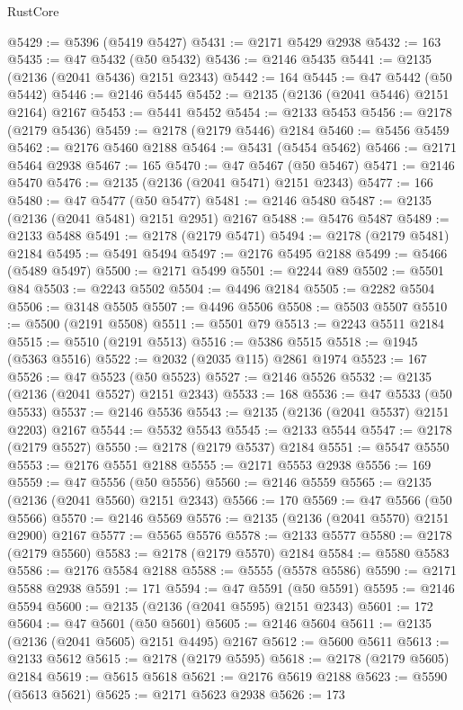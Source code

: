 \begin{lexlean}{RustCore}
\begin{coremodule}
@5429 := @5396 (@5419 @5427)
@5431 := @2171 @5429 @2938
@5432 := 163
@5435 := @47 @5432 (@50 @5432)
@5436 := @2146 @5435
@5441 := @2135 (@2136 (@2041 @5436) @2151 @2343)
@5442 := 164
@5445 := @47 @5442 (@50 @5442)
@5446 := @2146 @5445
@5452 := @2135 (@2136 (@2041 @5446) @2151 @2164) @2167
@5453 := @5441 @5452
@5454 := @2133 @5453
@5456 := @2178 (@2179 @5436)
@5459 := @2178 (@2179 @5446) @2184
@5460 := @5456 @5459
@5462 := @2176 @5460 @2188
@5464 := @5431 (@5454 @5462)
@5466 := @2171 @5464 @2938
@5467 := 165
@5470 := @47 @5467 (@50 @5467)
@5471 := @2146 @5470
@5476 := @2135 (@2136 (@2041 @5471) @2151 @2343)
@5477 := 166
@5480 := @47 @5477 (@50 @5477)
@5481 := @2146 @5480
@5487 := @2135 (@2136 (@2041 @5481) @2151 @2951) @2167
@5488 := @5476 @5487
@5489 := @2133 @5488
@5491 := @2178 (@2179 @5471)
@5494 := @2178 (@2179 @5481) @2184
@5495 := @5491 @5494
@5497 := @2176 @5495 @2188
@5499 := @5466 (@5489 @5497)
@5500 := @2171 @5499
@5501 := @2244 @89
@5502 := @5501 @84
@5503 := @2243 @5502
@5504 := @4496 @2184
@5505 := @2282 @5504
@5506 := @3148 @5505
@5507 := @4496 @5506
@5508 := @5503 @5507
@5510 := @5500 (@2191 @5508)
@5511 := @5501 @79
@5513 := @2243 @5511 @2184
@5515 := @5510 (@2191 @5513)
@5516 := @5386 @5515
@5518 := @1945 (@5363 @5516)
@5522 := @2032 (@2035 @115) @2861 @1974
@5523 := 167
@5526 := @47 @5523 (@50 @5523)
@5527 := @2146 @5526
@5532 := @2135 (@2136 (@2041 @5527) @2151 @2343)
@5533 := 168
@5536 := @47 @5533 (@50 @5533)
@5537 := @2146 @5536
@5543 := @2135 (@2136 (@2041 @5537) @2151 @2203) @2167
@5544 := @5532 @5543
@5545 := @2133 @5544
@5547 := @2178 (@2179 @5527)
@5550 := @2178 (@2179 @5537) @2184
@5551 := @5547 @5550
@5553 := @2176 @5551 @2188
@5555 := @2171 @5553 @2938
@5556 := 169
@5559 := @47 @5556 (@50 @5556)
@5560 := @2146 @5559
@5565 := @2135 (@2136 (@2041 @5560) @2151 @2343)
@5566 := 170
@5569 := @47 @5566 (@50 @5566)
@5570 := @2146 @5569
@5576 := @2135 (@2136 (@2041 @5570) @2151 @2900) @2167
@5577 := @5565 @5576
@5578 := @2133 @5577
@5580 := @2178 (@2179 @5560)
@5583 := @2178 (@2179 @5570) @2184
@5584 := @5580 @5583
@5586 := @2176 @5584 @2188
@5588 := @5555 (@5578 @5586)
@5590 := @2171 @5588 @2938
@5591 := 171
@5594 := @47 @5591 (@50 @5591)
@5595 := @2146 @5594
@5600 := @2135 (@2136 (@2041 @5595) @2151 @2343)
@5601 := 172
@5604 := @47 @5601 (@50 @5601)
@5605 := @2146 @5604
@5611 := @2135 (@2136 (@2041 @5605) @2151 @4495) @2167
@5612 := @5600 @5611
@5613 := @2133 @5612
@5615 := @2178 (@2179 @5595)
@5618 := @2178 (@2179 @5605) @2184
@5619 := @5615 @5618
@5621 := @2176 @5619 @2188
@5623 := @5590 (@5613 @5621)
@5625 := @2171 @5623 @2938
@5626 := 173

\end{coremodule}
\end{lexlean}
